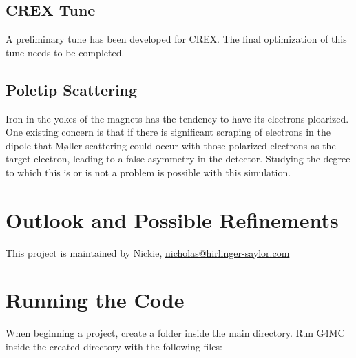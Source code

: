 \documentclass[11pt]{amsart}
\begin{document}
\FloatBarrier

\subsection{ CREX Tune }

A preliminary tune has been developed for CREX. The final optimization of this tune needs to be completed.

\subsection{ Poletip Scattering}

Iron in the yokes of the magnets has the tendency to have its electrons ploarized. One existing concern is that if there is significant scraping of electrons in the dipole that M\o ller scattering could occur with those polarized electrons as the target electron, leading to a false asymmetry in the detector. Studying the degree to which this is or is not a problem is possible with this simulation. 

\newpage
\section{Outlook and Possible Refinements}

This project is maintained by Nickie, \href{mailto:nicholas@hirlinger-saylor.com}{nicholas@hirlinger-saylor.com}

\section{Running the Code}

When beginning a project, create a folder inside the main directory. Run G4MC inside the created directory with the following files:
\end{document}
